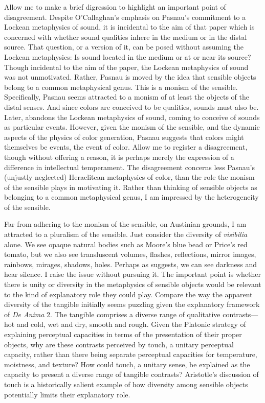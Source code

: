 Allow me to make a brief digression to highlight an important point of disagreement. Despite O'Callaghan's \citeyearpar{OCallaghan:2009aa} emphasis on Pasnau's \citeyearpar{Pasnau:1999ss} commitment to a Lockean metaphysics of sound, it is incidental to the aim of that paper which is concerned with whether sound qualities inhere in the medium or in the distal source. That question, or a version of it, can be posed without assuming the Lockean metaphysics: Is sound located in the medium or at or near its source? Though incidental to the aim of the paper, the Lockean metaphysics of sound was not unmotivated. Rather, Pasnau is moved by the idea that sensible objects belong to a common metaphysical genus. This is a monism of the sensible. Specifically, Pasnau seems attracted to a monism of at least the objects of the distal senses. And since colors are conceived to be qualities, sounds must also be. Later, \citet{Pasnau:2009ys} abandons the Lockean metaphysics of sound, coming to conceive of sounds as particular events. However, given the monism of the sensible, and the dynamic aspects of the physics of color generation, Pasnau suggests that colors might themselves be events, the event of color. Allow me to register a disagreement, though without offering a reason, it is perhaps merely the expression of a difference in intellectual temperament. The disagreement concerns less Pasnau's (unjustly neglected) Heraclitean metaphysics of color, than the role the monism of the sensible plays in motivating it. Rather than thinking of sensible objects as belonging to a common metaphysical genus, I am impressed by the heterogeneity of the sensible. 

Far from adhering to the monism of the sensible, on Austinian grounds, I am attracted to a pluralism of the sensible. Just consider the diversity of \emph{visibilia} alone. We see opaque natural bodies such as Moore's \citeyearpar{Moore:1903uo} blue bead or Price's \citeyearpar{Price:1932fk} red tomato, but we also see transluscent volumes, flashes, reflections, mirror images, rainbows, mirages, shadows, holes. Perhaps as \citet{Sorensen:2004jk,Sorensen:2008kx,Sorensen:2009aa} suggests, we can see darkness and hear silence. I raise the issue without pursuing it. The important point is whether there is unity or diversity in the metaphysics of sensible objects would be relevant to the kind of explanatory role they could play. Compare the way the apparent diversity of the tangible initially seems puzzling given the explanatory framework of \emph{De Anima} 2. The tangible comprises a diverse range of qualitative contrasts---hot and cold, wet and dry, smooth and rough. Given the Platonic strategy of explaining perceptual capacities in terms of the presentation of their proper objects, why are these contrasts perceived by touch, a unitary perceptual capacity, rather than there being separate perceptual capacities for temperature, moistness, and texture? How could touch, a unitary sense, be explained as the capacity to present a diverse range of tangible contrasts? Aristotle's discussion of touch is a historically salient example of how diversity among sensible objects potentially limits their explanatory role.

